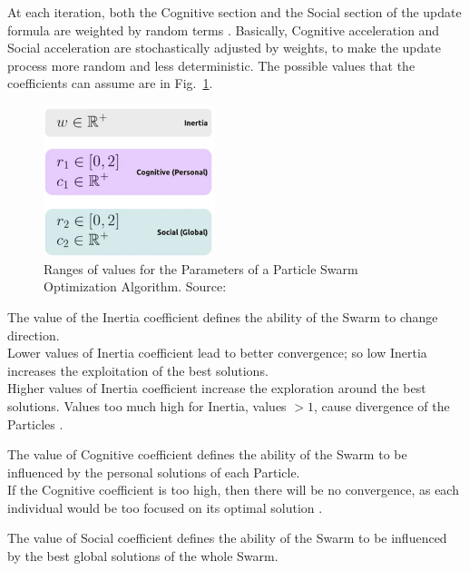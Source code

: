 At each iteration, both the Cognitive section and the Social section of the update formula are weighted by random terms \cite{Tesi-3.2} \cite{Tesi-3.5}.
Basically, Cognitive acceleration and Social acceleration are stochastically adjusted by weights, to make the update process more random and less deterministic. The possible values that the coefficients can assume are in Fig.~\ref{fig:figure-3.2.3}.
\begin{figure}[t]
	\centering
	\includegraphics[width=5cm]{figures/figure-3.2.3.png}
	\caption[Values Ranges for PSO Parameters]{Ranges of values for the Parameters of a Particle Swarm Optimization Algorithm. Source:~\cite{Tesi-3.2}}
	\label{fig:figure-3.2.3}
\end{figure}

The value of the Inertia coefficient defines the ability of the Swarm to change direction.
\\[0.3cm]Lower values of Inertia coefficient lead to better convergence; so low Inertia increases the exploitation of the best solutions.
\\[0.3cm]Higher values of Inertia coefficient increase the exploration around the best solutions.
Values too much high for Inertia, values $>1$, cause divergence of the Particles \cite{Tesi-3.2}.

The value of Cognitive coefficient defines the ability of the Swarm to be influenced by the personal solutions of each Particle.
\\[0.3cm]If the Cognitive coefficient is too high, then there will be no convergence, as each individual would be too focused on its optimal solution \cite{Tesi-3.2}.

The value of Social coefficient defines the ability of the Swarm to be influenced by the best global solutions of the whole Swarm.

